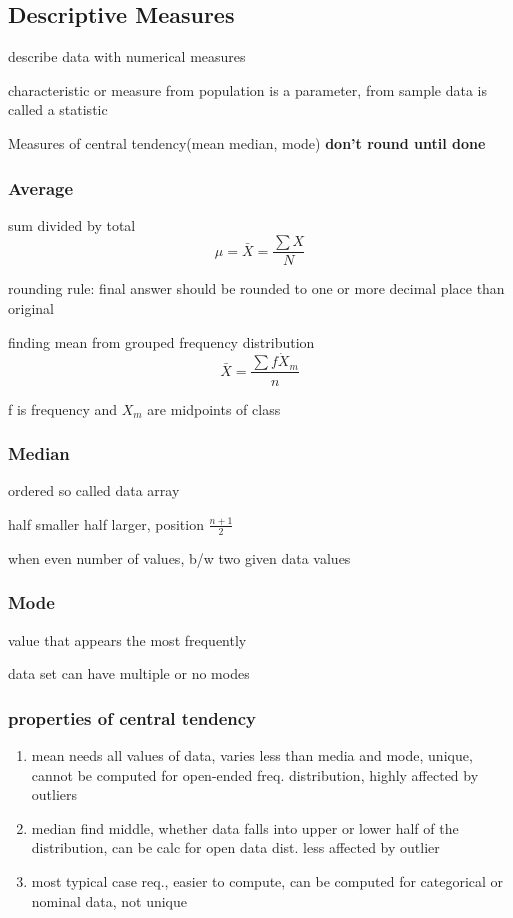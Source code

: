 \documentclass[11pt]{amsart}
\begin{document}
\subsection{Descriptive Measures}
  \par describe data with numerical measures
  \par characteristic or measure from population is a parameter, from sample
  data is called a statistic
  \par Measures of central tendency(mean median, mode)
  \textbf{don't round until done}
  \subsubsection{Average}
  \par sum divided by total
  \begin{equation*}
    \mu = \bar{X} = \frac{\sum{X}}{N}
  \end{equation*}
  \par rounding rule: final answer should be rounded to one or more decimal
  place than original
  \par finding mean from grouped frequency distribution
  \begin{equation}
    \bar{X} = \frac{\sum{f \dot X_m}}{n}
  \end{equation}
  \par f is frequency and $X_m$ are midpoints of class
  \subsubsection{Median}
  \par ordered so called data array
  \par half smaller half larger, position $\frac{n+1}{2}$
  \par when even number of values, b/w two given data values
  \subsubsection{Mode}
  \par value that appears the most frequently
  \par data set can have multiple or no modes
  \subsubsection{properties of central tendency}
 	\begin{enumerate}
	\item mean needs all values of data, varies less than media and mode, unique, cannot be computed for open-ended freq. distribution, highly affected by outliers
	\item median find middle, whether data falls into upper or lower half of the distribution, can be calc for open data dist. less affected by outlier
	\item most typical case req., easier to compute, can be computed for categorical or nominal data, not unique
	\end{enumerate}
\end{document}
